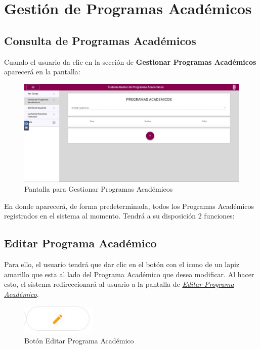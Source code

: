 \section{Gestión de Programas Académicos}
    \subsection{Consulta de Programas Académicos}
        Cuando el usuario da clic en la sección de \textbf{Gestionar Programas Académicos} aparecerá en la pantalla:


        \begin{figure}[!hbtp]
        	\centering
        	\hypertarget{consultarpa}{\includegraphics[width=0.7\linewidth]{images/SP3/ConsultarPA}}
        	\caption{Pantalla para Gestionar Programas Académicos}
        	\label{consultarpa}
        \end{figure}

        En donde aparecerá, de forma predeterminada, todos los Programas Académicos  registrados en el sistema al momento. Tendrá a su disposición 2 funciones:

	    \subsection{Editar Programa Académico}

        	Para ello, el usuario tendrá que dar clic en el botón con el icono de un lapiz amarillo que esta al lado del Programa Académico que desea modificar. Al hacer esto, el sistema redireccionará al usuario a la pantalla de \hyperlink{editarpa}{\textit{Editar Programa Académico}}.

        	\begin{figure}[!hbtp]
        		\centering
        		\hypertarget{editar}{\includegraphics[width=0.7\linewidth]{images/SP3/BtnEditar}}
        		\caption{Botón Editar Programa Académico}
        		\label{editar}
        	\end{figure}

